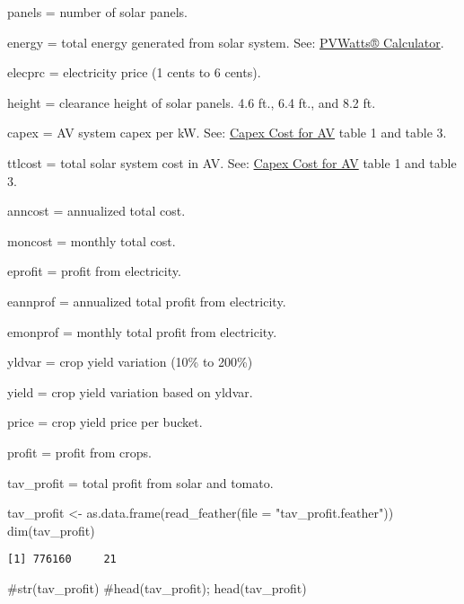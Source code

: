 \documentclass[
  letterpaper,
  DIV=11,
  numbers=noendperiod]{scrartcl}
\newenvironment{Shaded}{\begin{snugshade}}{\end{snugshade}}
\newcommand{\AttributeTok}[1]{\textcolor[rgb]{0.40,0.45,0.13}{#1}}
\newcommand{\CommentTok}[1]{\textcolor[rgb]{0.37,0.37,0.37}{#1}}
\newcommand{\FunctionTok}[1]{\textcolor[rgb]{0.28,0.35,0.67}{#1}}
\newcommand{\NormalTok}[1]{\textcolor[rgb]{0.00,0.23,0.31}{#1}}
\newcommand{\OtherTok}[1]{\textcolor[rgb]{0.00,0.23,0.31}{#1}}
\newcommand{\StringTok}[1]{\textcolor[rgb]{0.13,0.47,0.30}{#1}}
\begin{document}
panels = number of solar panels.

energy = total energy generated from solar system. See:
\href{https://pvwatts.nrel.gov/pvwatts.php}{PVWatts® Calculator}.

elecprc = electricity price (1 cents to 6 cents).

height = clearance height of solar panels. 4.6 ft., 6.4 ft., and 8.2 ft.

capex = AV system capex per kW. See:
\href{https://www.nrel.gov/docs/fy21osti/77811.pdf}{Capex Cost for AV}
table 1 and table 3.

ttlcost = total solar system cost in AV. See:
\href{https://www.nrel.gov/docs/fy21osti/77811.pdf}{Capex Cost for AV}
table 1 and table 3.

anncost = annualized total cost.

moncost = monthly total cost.

eprofit = profit from electricity.

eannprof = annualized total profit from electricity.

emonprof = monthly total profit from electricity.

yldvar = crop yield variation (10\% to 200\%)

yield = crop yield variation based on yldvar.

price = crop yield price per bucket.

profit = profit from crops.

tav\_profit = total profit from solar and tomato.

\begin{Shaded}
\begin{Highlighting}[]
\NormalTok{tav\_profit }\OtherTok{\textless{}{-}} \FunctionTok{as.data.frame}\NormalTok{(}\FunctionTok{read\_feather}\NormalTok{(}\AttributeTok{file =} \StringTok{"tav\_profit.feather"}\NormalTok{))}
\FunctionTok{dim}\NormalTok{(tav\_profit)}
\end{Highlighting}
\end{Shaded}

\begin{verbatim}
[1] 776160     21
\end{verbatim}

\begin{Shaded}
\begin{Highlighting}[]
\CommentTok{\#str(tav\_profit)}
\CommentTok{\#head(tav\_profit); head(tav\_profit)}
\end{Highlighting}
\end{Shaded}
\end{document}
